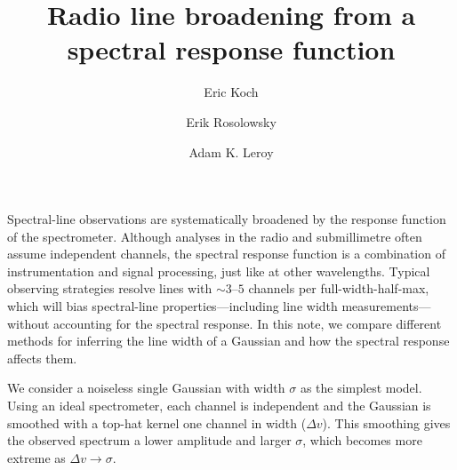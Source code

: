 \documentclass{rnaastex}
\begin{document}
\title{Radio line broadening from a spectral response function}

\author[0000-0001-9605-780X]{Eric Koch}
\author[0000-0002-5204-2259]{Erik Rosolowsky}
\author[0000-0002-2545-1700]{Adam K. Leroy}


\keywords{}


\section{}

Spectral-line observations are systematically broadened by the response function of the spectrometer. Although analyses in the radio and submillimetre often assume independent channels, the spectral response function is a combination of instrumentation and signal processing, just like at other wavelengths.  Typical observing strategies resolve lines with $\sim3\mbox{--}5$ channels per full-width-half-max, which will bias spectral-line properties---including line width measurements--- without accounting for the spectral response.  In this note, we compare different methods for inferring the line width of a Gaussian and how the spectral response affects them.

We consider a noiseless single Gaussian with width $\sigma$ as the simplest model. Using an ideal spectrometer, each channel is independent and the Gaussian is smoothed with a top-hat kernel one channel in width ($\Delta v$). This smoothing gives the observed spectrum a lower amplitude and larger $\sigma$, which becomes more extreme as $\Delta v \rightarrow \sigma$.
\end{document}
